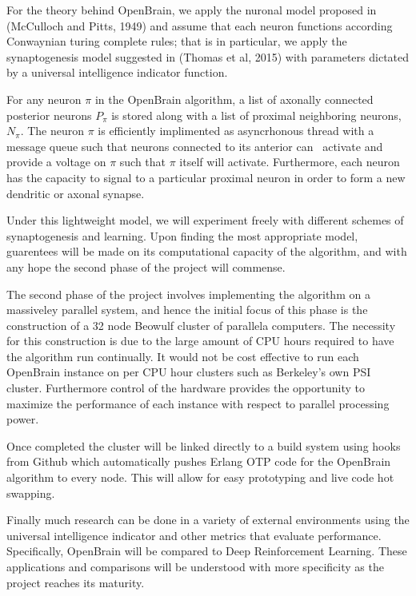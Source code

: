 \documentclass[letter]{article}
\begin{document}
For the theory behind OpenBrain, we apply the nuronal model proposed in (McCulloch and Pitts, 1949) and assume that each neuron
functions according Conwaynian turing complete rules; that is in particular, we apply the synaptogenesis model suggested in
(Thomas et al, 2015) with parameters dictated by a universal intelligence indicator function.

For any neuron $\pi$ in the OpenBrain algorithm, a list of axonally connected posterior neurons $P_\pi$ is stored along with
a list of proximal neighboring neurons, $N_\pi.$ The neuron $\pi$ is efficiently implimented as asyncrhonous thread with a message
queue such that neurons connected to its anterior can \ activate and provide a voltage on $\pi$ such that $\pi$ itself
will activate. Furthermore, each neuron has the capacity to signal to a particular proximal neuron in order to form a new dendritic or axonal 
synapse. 

Under this lightweight model, we will experiment freely with different schemes of synaptogenesis and learning. Upon finding the most
appropriate model, guarentees will be made on its computational capacity of the algorithm, and with any hope the second
phase of the project will commense.

The second phase of the project involves implementing the algorithm on a massiveley parallel system, and hence the initial
focus of this phase is the construction of a 32 node Beowulf cluster of parallela computers. The necessity for this construction
is due to the large amount of CPU hours required to have the algorithm run continually. It would not be cost effective to run
each OpenBrain instance on per CPU hour clusters such as Berkeley's own PSI cluster.  Furthermore control of the hardware
provides the opportunity to maximize the performance of each instance with respect to parallel processing power.

Once completed the cluster will be linked directly to a build system using hooks from Github which automatically pushes Erlang
OTP code for the OpenBrain algorithm to every node. This will allow for easy prototyping and live code hot swapping. 

Finally much research can be done in a variety of external environments using the universal intelligence indicator and other metrics that evaluate performance.
Specifically, OpenBrain will be compared to Deep Reinforcement Learning. These applications and comparisons will be 
understood with more specificity as the project reaches its maturity.
\end{document}
